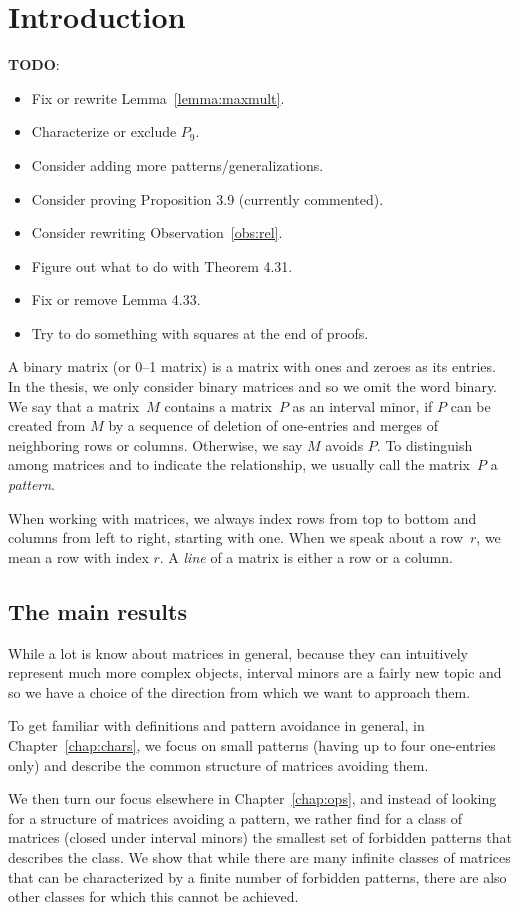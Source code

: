 \chapter{Introduction}
\textbf{TODO}:
\begin{itemize}
	\item Fix or rewrite Lemma~\ref{lemma:maxmult}.
	\item Characterize or exclude $P_9$.
	\item Consider adding more patterns/generalizations.
	\item Consider proving Proposition 3.9 (currently commented).
	\item Consider rewriting Observation~\ref{obs:rel}.
	\item Figure out what to do with Theorem 4.31.
	\item Fix or remove Lemma 4.33.
	\item Try to do something with squares at the end of proofs.
\end{itemize}

A binary matrix (or 0--1 matrix) is a matrix with ones and zeroes as its entries. In the thesis, we only consider binary matrices and so we omit the word binary. We say that a matrix~$M$ contains a matrix~$P$ as an interval minor, if $P$ can be created from $M$ by a sequence of deletion of one-entries and merges of neighboring rows or columns. Otherwise, we say $M$ avoids $P$. To distinguish among matrices and to indicate the relationship, we usually call the matrix~$P$ a \emph{pattern}.

When working with matrices, we always index rows from top to bottom and columns from left to right, starting with one. When we speak about a row~$r$, we mean a row with index $r$. A \emph{line} of a matrix is either a row or a column.

\section{The main results}
While a lot is know about matrices in general, because they can intuitively represent much more complex objects, interval minors are a fairly new topic and so we have a choice of the direction from which we want to approach them.

To get familiar with definitions and pattern avoidance in general, in Chapter~\ref{chap:chars}, we focus on small patterns (having up to four one-entries only) and describe the common structure of matrices avoiding them.

We then turn our focus elsewhere in Chapter~\ref{chap:ops}, and instead of looking for a structure of matrices avoiding a pattern, we rather find for a class of matrices (closed under interval minors) the smallest set of forbidden patterns that describes the class. We show that while there are many infinite classes of matrices that can be characterized by a finite number of forbidden patterns, there are also other classes for which this cannot be achieved.


